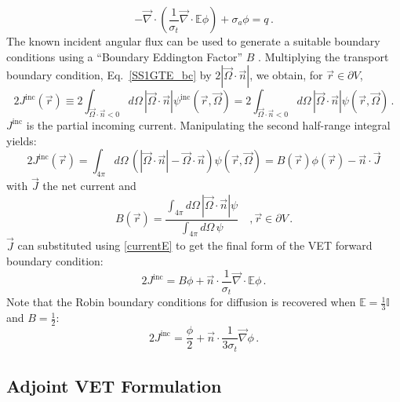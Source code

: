 \documentclass[12pt]{report}
\newcommand{\vr}{\vec{r}}
\newcommand{\vJ}{\vec{J}}
\newcommand{\vO}{\vec{\Omega}}
\renewcommand{\div}{\vec{\nabla} \cdot}
\newcommand{\grad}{\vec{\nabla}}
\newcommand{\bound}{\partial V}
\newcommand{\vn}{\vec{n}}
\newcommand{\Edd}{\mathbb{E}}
\newcommand{\BEdd}{B}
\newcommand{\sigt}{\sigma_t}
\newcommand{\siga}{\sigma_a}
\newcommand{\scalSource}{q}
\begin{document}
\begin{equation}
\label{VEFForm}
- \div \left( \frac{1}{\sigt}\div \Edd \phi \right) + \siga \phi = \scalSource \,.
\end{equation}
The known incident angular flux can be used to generate a suitable boundary conditions using a 
``Boundary Eddington Factor'' $\BEdd$ \cite{Miften}. Multiplying the transport boundary condition,
Eq.~\eqref{SS1GTE_bc} by $2 | \vO \cdot \vn |$, we obtain, for $\vr \in \bound$,
\begin{equation}
2 J^{\text{inc}}(\vr) \equiv  2 \int_{\vO \cdot \vn <0 }  d \Omega\, | \vO \cdot \vec{n} | \psi^{\text{inc}}(\vr,\vO) 
= 2\int_{\vO \cdot \vn <0 } d \Omega\,  | \vO \cdot \vn |  \psi(\vr,\vO) \,.
\end{equation}
$J^{\text{inc}}$ is the partial incoming current. 
Manipulating the second half-range integral yields:
\begin{equation}
2 J^{\text{inc}}(\vr) = \int_{4\pi} d \Omega\,  \left( | \vO \cdot \vn |- \vO\cdot\vn\right)  \psi(\vr,\vO) 
= \BEdd(\vr) \phi(\vr) - \vn \cdot \vJ 
\end{equation}
with $\vJ$ the net current and
\begin{equation}
\BEdd(\vr) = \frac{\int_{4 \pi} d\Omega \, | \vO \cdot \vn | \psi}{\int_{4\pi} d\Omega \, \psi} \quad , \vr \in \bound \,.
\end{equation}
$\vJ$ can substituted using \eqref{currentE} to get the final form of the VET forward boundary condition:
\begin{equation}
2 J^{\text{inc}} = \BEdd \phi + \vn \cdot \frac{1}{\sigt} \div \Edd \phi \,.
\end{equation}
Note that the Robin boundary conditions for diffusion is recovered when $\Edd = \tfrac{1}{3} \mathbb{I}$ and $B=\tfrac{1}{2}$:
\[
2 J^{\text{inc}} = \frac{\phi}{2} + \vn \cdot \frac{1}{3\sigt} \grad \phi \,.
\]


\subsection{Adjoint VET Formulation}
\end{document}
